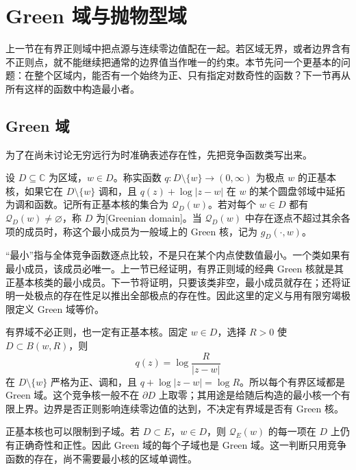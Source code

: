 \section{Green 域与抛物型域}
\label{b3:sec:1702}

上一节在有界正则域中把点源与连续零边值配在一起。若区域无界，或者边界含有不正则点，就不能继续把通常的边界值当作唯一的约束。本节先问一个更基本的问题：在整个区域内，能否有一个始终为正、只有指定对数奇性的函数？下一节再从所有这样的函数中构造最小者。

\subsection{Green 域}
\label{b3:subsec:170201}

为了在尚未讨论无穷远行为时准确表述存在性，先把竞争函数类写出来。

\begin{definition}\label{b3:def:17-green-domain}
设 \(D\subseteq\mathbb C\) 为区域，\(w\in D\)。称实函数 \(q:D\setminus\{w\}\to(0,\infty)\) 为极点 \(w\) 的正基本核，如果它在 \(D\setminus\{w\}\) 调和，且 \(q(z)+\log|z-w|\) 在 \(w\) 的某个圆盘邻域中延拓为调和函数。记所有正基本核的集合为 \(\mathcal Q_D(w)\)。若对每个 \(w\in D\) 都有 \(\mathcal Q_D(w)\ne\varnothing\)，称 \(D\) 为[Greenian domain]。当 \(\mathcal Q_D(w)\) 中存在逐点不超过其余各项的成员时，称这个最小成员为一般域上的 Green 核，记为 \(g_D(\cdot,w)\)。
\end{definition}

“最小”指与全体竞争函数逐点比较，不是只在某个内点使数值最小。一个类如果有最小成员，该成员必唯一。上一节已经证明，有界正则域的经典 Green 核就是其正基本核类的最小成员。下一节将证明，只要该类非空，最小成员就存在；还将证明一处极点的存在性足以推出全部极点的存在性。因此这里的定义与用有限穷竭极限定义 Green 域等价。

\ProseParagraphBreak
有界域不必正则，也一定有正基本核。固定 \(w\in D\)，选择 \(R>0\) 使 \(D\subset B(w,R)\)，则
\[
 q(z)=\log\frac R{|z-w|}
\]
在 \(D\setminus\{w\}\) 严格为正、调和，且 \(q+\log|z-w|=\log R\)。所以每个有界区域都是 Green 域。这个竞争核一般不在 \(\partial D\) 上取零；其用途是给随后构造的最小核一个有限上界。边界是否正则影响连续零边值的达到，不决定有界域是否有 Green 核。

\ProseParagraphBreak
正基本核也可以限制到子域。若 \(D\subset E\)，\(w\in D\)，则 \(\mathcal Q_E(w)\) 的每一项在 \(D\) 上仍有正确奇性和正性。因此 Green 域的每个子域也是 Green 域。这一判断只用竞争函数的存在，尚不需要最小核的区域单调性。

